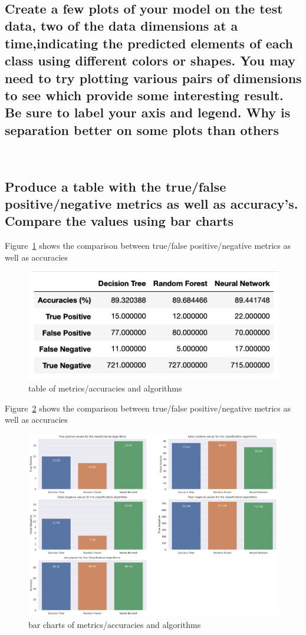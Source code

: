\\
\subsection{Create a few plots of your model on the test data, two of the data dimensions at a time,indicating the predicted elements of each class using different colors or shapes. You may need to try plotting various pairs of dimensions to see which provide some interesting result. Be sure to label your axis and legend. Why is separation better on some plots than others}

\\



\subsection{Produce a table with the true/false positive/negative metrics as well as accuracy's. Compare the values using bar charts}

Figure~\ref{fig:fig4} shows the comparison between true/false positive/negative metrics as well as accuracies
\begin{figure}[!ht]
 \centering
\includegraphics[width=6.1in]{assignment2/1-5_table.png}
\caption{\label{fig:fig4}table of metrics/accuracies and algorithms}
\end{figure}

Figure~\ref{fig:fig5} shows the comparison between true/false positive/negative metrics as well as accuracies
\begin{figure}[!ht]
 \centering
\includegraphics[width=6.1in]{assignment2/80-20_barcharts_algorithms.png}
\caption{\label{fig:fig5}bar charts of metrics/accuracies and algorithms}
\end{figure}


